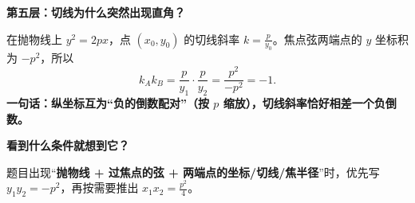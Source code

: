 \begin{explanationbox}
\medskip
\textbf{\textcolor{CExplanation}{第五层：切线为什么突然出现直角？}}\par\smallskip
在抛物线上 $y^2=2px$，点 $(x_0,y_0)$ 的切线斜率
$k=\frac{p}{y_0}$。焦点弦两端点的 $y$ 坐标积为 $-p^2$，所以
\[
 k_Ak_B=\frac p{y_1}\cdot\frac p{y_2}
 =\frac{p^2}{-p^2}=-1.
\]
\textbf{一句话：纵坐标互为“负的倒数配对”（按 $p$ 缩放），切线斜率恰好相差一个负倒数。}

\medskip
\textbf{\textcolor{CExplanation}{看到什么条件就想到它？}}\par\smallskip
题目出现“\textbf{抛物线 + 过焦点的弦 + 两端点的坐标/切线/焦半径}”时，优先写
$y_1y_2=-p^2$，再按需要推出 $x_1x_2=\frac{p^2}{4}$。
\end{explanationbox}

